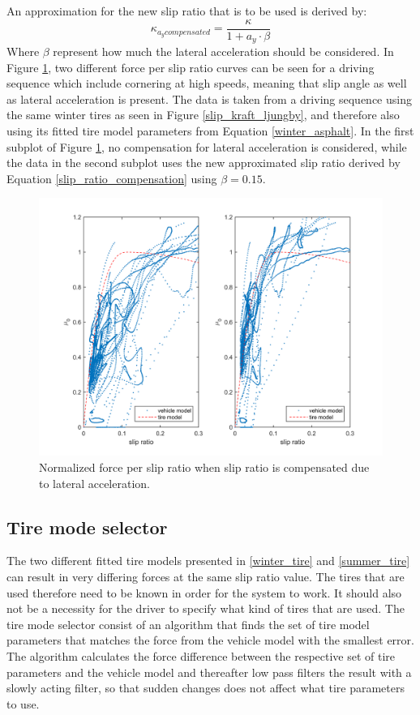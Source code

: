 An approximation for the new slip ratio that is to be used is derived by:
\begin{equation}
\label{slip_ratio_compensation}
\kappa_{a_{y} compensated} = \dfrac{\kappa}{1 + a_{y}\cdot \beta}
\end{equation}
Where $ \beta $ represent how much the lateral acceleration should be considered. In Figure \ref{latacc_compensated}, two different force per slip ratio curves can be seen for a driving sequence which include cornering at high speeds, meaning that slip angle as well as lateral acceleration is present. The data is taken from a driving sequence using the same winter tires as seen in Figure \ref{slip_kraft_ljungby}, and therefore also using its fitted tire model parameters from Equation \ref{winter_asphalt}. In the first subplot of Figure \ref{latacc_compensated}, no compensation for lateral acceleration is considered, while the data in the second subplot uses the new approximated slip ratio derived by Equation \ref{slip_ratio_compensation} using $ \beta = 0.15 $. 
\begin{figure}[h]
	\centering
	\includegraphics[width=1.0\textwidth]{Pictures/latacc_compensated}
	\caption {Normalized force per slip ratio when slip ratio is compensated due to lateral acceleration.}
	\label{latacc_compensated}
\end{figure}

\subsection{Tire mode selector}
The two different fitted tire models presented in \ref{winter_tire} and \ref{summer_tire} can result in very differing forces at the same slip ratio value. The tires that are used therefore need to be known in order for the system to work. It should also not be a necessity for the driver to specify what kind of tires that are used. The tire mode selector consist of an algorithm that finds the set of tire model parameters that matches the force from the vehicle model with the smallest error. The algorithm calculates the force difference between the respective set of tire parameters and the vehicle model and thereafter low pass filters the result with a slowly acting filter, so that sudden changes does not affect what tire parameters to use. 

